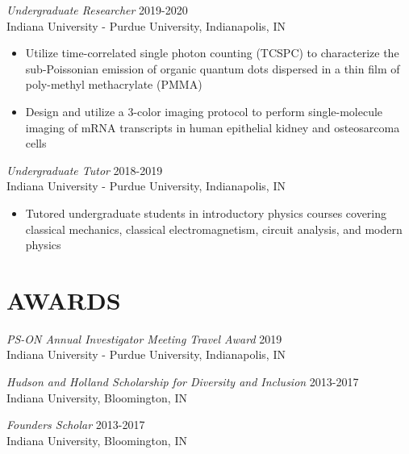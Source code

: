 \documentclass[margin, 10pt]{res} %
\begin{document}
\begin{resume}
\begin{itemize}
\end{itemize}
 
{\sl Undergraduate Researcher} \hfill 2019-2020\\
Indiana University - Purdue University, Indianapolis, IN
\begin{itemize} \itemsep -2pt %

\item Utilize time-correlated single photon counting (TCSPC) to characterize the sub-Poissonian emission of organic quantum dots dispersed in a thin film of poly-methyl methacrylate (PMMA)

\item Design and utilize a 3-color imaging protocol to perform single-molecule imaging of mRNA transcripts in human epithelial kidney and osteosarcoma cells 

\end{itemize} 


{\sl Undergraduate Tutor} \hfill 2018-2019\\
Indiana University - Purdue University, Indianapolis, IN
\begin{itemize} \itemsep -2pt %

\item Tutored undergraduate students in introductory physics courses covering classical mechanics, classical electromagnetism, circuit analysis, and modern physics

\end{itemize} 



\section{AWARDS}

{\sl PS-ON Annual Investigator Meeting Travel Award} \hfill 2019 \\
Indiana University - Purdue University, Indianapolis, IN

{\sl Hudson and Holland Scholarship for Diversity and Inclusion} \hfill 2013-2017 \\
Indiana University, Bloomington, IN 

{\sl Founders Scholar} \hfill 2013-2017 \\
Indiana University, Bloomington, IN 


\end{resume}
\end{document}
